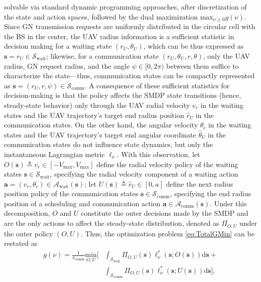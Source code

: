 \documentclass[10pt,twocolumn]{IEEEtran}
\begin{document}
solvable via standard dynamic programming approaches, after discretization of the state and action spaces, followed by the dual maximization $\mathrm{max}_{\nu{\geq}0}g(\nu)$. Since GN transmission requests are uniformly distributed in the circular cell with the BS in the center, the UAV radius information is a sufficient statistic in decision making for a waiting state $(r_{U},\theta_{U})$, which can be thus expressed as $\mathbf{s}{=}r_{U}{\in}\mathcal{S}_{\mathrm{wait}}$; likewise, for a communication state $(r_{U},\theta_{U},r,\theta)$, only the UAV radius, GN request radius, and the angle $\psi{\in}[0,2\pi)$ between them suffice to characterize the state---thus, communication states can be compactly represented as $\mathbf{s}{=}(r_{U},r,\psi){\in}\mathcal{S}_{\mathrm{comm}}$. A consequence of these sufficient statistics for decision-making is that the policy affects the SMDP state transitions (hence, steady-state behavior) only through the UAV radial velocity $v_{r}$ in the waiting states and the UAV trajectory's target end radius position $\hat{r}_{U}$ in the communication states. On the other hand, the angular velocity $\theta_{c}$ in the waiting states and the UAV trajectory's target end angular coordinate $\hat{\theta}_{U}$ in the communication states do not influence state dynamics, but only the instantaneous Lagrangian metric $\ell_{\nu}$. With this observation, let $O(\mathbf{s}){\triangleq}v_{r}{\in}[-V_{\mathrm{max}},V_{\mathrm{max}}]$ define the radial velocity policy of the waiting states $\mathbf{s}{\in}\mathcal{S}_{\mathrm{wait}}$, specifying the radial velocity component of a waiting action $\mathbf{a}{=}(v_{r},\theta_{c}) \in \mathcal{A}_{\mathrm{wait}}(\mathbf{s})$; let $U(\mathbf{s}){\triangleq}\hat{r}_{U}{\in}[0,a]$ define the next radius position policy of the communication states $\mathbf{s}{\in}\mathcal{S}_{\mathrm{comm}}$, specifying the end radius position of a scheduling and communication action $\mathbf{a}{\in}\mathcal{A}_{\mathrm{comm}}(\mathbf{s})$. Under this decomposition, $O$ and $U$ constitute the outer decisions made by the SMDP and are the only actions to affect the steady-state distribution, denoted as $\Pi_{O,U}$ under the outer policy $(O,U)$. Thus, the optimization problem \eqref{eq:TotalGMin} can be restated as
\begin{align}\label{eq:PolDecomp}
	g(\nu) = \frac{1}{\pi_{\mathrm{comm}}} \underset{O,U}{\mathrm{min}} \Bigr[ &\int_{\mathcal{S}_{\mathrm{wait}}} \Pi_{O,U}(\mathbf{s}) \ell_{\nu}^{*}(\mathbf{s}; O(\mathbf{s}))\mathrm{d}\mathbf{s} +\nonumber\\&\int_{\mathcal{S}_{\mathrm{comm}}} \Pi_{O,U}(\mathbf{s}) \ell_{\nu}^{*}(\mathbf{s}; U(\mathbf{s})) \mathrm{d}\mathbf{s} \Bigr],
\end{align}
\end{document}
